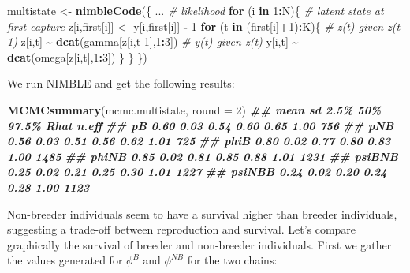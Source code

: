 \documentclass[
  12pt,
]{krantz}
\newenvironment{Shaded}{\begin{snugshade}}{\end{snugshade}}
\newcommand{\AttributeTok}[1]{\textcolor[rgb]{0.13,0.29,0.53}{#1}}
\newcommand{\CommentTok}[1]{\textcolor[rgb]{0.56,0.35,0.01}{\textit{#1}}}
\newcommand{\ControlFlowTok}[1]{\textcolor[rgb]{0.13,0.29,0.53}{\textbf{#1}}}
\newcommand{\DecValTok}[1]{\textcolor[rgb]{0.00,0.00,0.81}{#1}}
\newcommand{\DocumentationTok}[1]{\textcolor[rgb]{0.56,0.35,0.01}{\textbf{\textit{#1}}}}
\newcommand{\FunctionTok}[1]{\textcolor[rgb]{0.13,0.29,0.53}{\textbf{#1}}}
\newcommand{\NormalTok}[1]{#1}
\newcommand{\OtherTok}[1]{\textcolor[rgb]{0.56,0.35,0.01}{#1}}
\newcommand{\SpecialCharTok}[1]{\textcolor[rgb]{0.81,0.36,0.00}{\textbf{#1}}}
\begin{document}
\begin{Shaded}
\begin{Highlighting}[]
\NormalTok{multistate }\OtherTok{\textless{}{-}} \FunctionTok{nimbleCode}\NormalTok{(\{}
\NormalTok{...}
  \CommentTok{\# likelihood}
  \ControlFlowTok{for}\NormalTok{ (i }\ControlFlowTok{in} \DecValTok{1}\SpecialCharTok{:}\NormalTok{N)\{}
    \CommentTok{\# latent state at first capture}
\NormalTok{    z[i,first[i]] }\OtherTok{\textless{}{-}}\NormalTok{ y[i,first[i]] }\SpecialCharTok{{-}} \DecValTok{1}
    \ControlFlowTok{for}\NormalTok{ (t }\ControlFlowTok{in}\NormalTok{ (first[i]}\SpecialCharTok{+}\DecValTok{1}\NormalTok{)}\SpecialCharTok{:}\NormalTok{K)\{}
      \CommentTok{\# z(t) given z(t{-}1)}
\NormalTok{      z[i,t] }\SpecialCharTok{\textasciitilde{}} \FunctionTok{dcat}\NormalTok{(gamma[z[i,t}\DecValTok{{-}1}\NormalTok{],}\DecValTok{1}\SpecialCharTok{:}\DecValTok{3}\NormalTok{])}
      \CommentTok{\# y(t) given z(t)}
\NormalTok{      y[i,t] }\SpecialCharTok{\textasciitilde{}} \FunctionTok{dcat}\NormalTok{(omega[z[i,t],}\DecValTok{1}\SpecialCharTok{:}\DecValTok{3}\NormalTok{])}
\NormalTok{    \}}
\NormalTok{  \}}
\NormalTok{\})}
\end{Highlighting}
\end{Shaded}

We run NIMBLE and get the following results:

\begin{Shaded}
\begin{Highlighting}[]
\FunctionTok{MCMCsummary}\NormalTok{(mcmc.multistate, }\AttributeTok{round =} \DecValTok{2}\NormalTok{)}
\DocumentationTok{\#\#        mean   sd 2.5\%  50\% 97.5\% Rhat n.eff}
\DocumentationTok{\#\# pB     0.60 0.03 0.54 0.60  0.65 1.00   756}
\DocumentationTok{\#\# pNB    0.56 0.03 0.51 0.56  0.62 1.01   725}
\DocumentationTok{\#\# phiB   0.80 0.02 0.77 0.80  0.83 1.00  1485}
\DocumentationTok{\#\# phiNB  0.85 0.02 0.81 0.85  0.88 1.01  1231}
\DocumentationTok{\#\# psiBNB 0.25 0.02 0.21 0.25  0.30 1.01  1227}
\DocumentationTok{\#\# psiNBB 0.24 0.02 0.20 0.24  0.28 1.00  1123}
\end{Highlighting}
\end{Shaded}

Non-breeder individuals seem to have a survival higher than breeder individuals, suggesting a trade-off between reproduction and survival. Let's compare graphically the survival of breeder and non-breeder individuals. First we gather the values generated for \(\phi^B\) and \(\phi^{NB}\) for the two chains:
\end{document}
